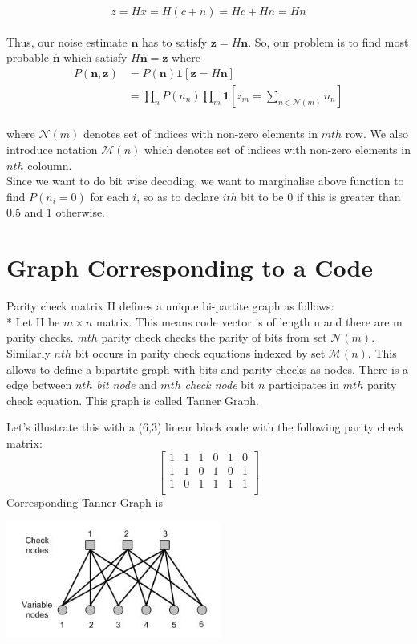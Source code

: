 \documentclass[a4paper]{article}
\begin{document}
    $$z =Hx= H(c + n) = Hc + Hn = Hn$$
    \\Thus, our noise estimate $\mathbf{n}$ has to satisfy $\mathbf{z} = H\mathbf{n}$. So, our problem is to find most probable $\mathbf{\hat{n}}$ which satisfy $H\mathbf{\hat{n}} = \mathbf{z}$ where
    \begin{align*}
    P(\mathbf{n},\mathbf{z}) &= P(\mathbf{n}) \mathbf{1}[\mathbf{z} = H\mathbf{n}]\\
    &= \prod_{n}  P(n_n)\prod_{m} \mathbf{1}[z_m = \sum_{n \in \mathcal{N}(m)} n_n]
    \end{align*}
    \\ where  $\mathcal{N}(m)$ denotes set of indices with non-zero elements in $m th$  row. We also introduce notation $\mathcal{M}(n)$ which denotes set of indices with non-zero elements in $n th$  coloumn. 
\\ Since we want to do bit wise decoding, we want to marginalise above function to find $P(n_i=0)$ for each $i$, so as to declare $i th$ bit to be $0$ if this is greater than 0.5 and $1$ otherwise.

\section{Graph Corresponding to a Code}
Parity check matrix H defines a unique bi-partite graph as follows:
\\* Let H be $m  \times n$ matrix. This means code vector is of length n and there are m parity checks. $mth$ parity check checks the parity of bits from set   $\mathcal{N}(m)$. Similarly $nth$ bit occurs in parity check equations indexed by set $\mathcal{M}(n)$. This allows to define a bipartite graph with bits and parity checks as nodes. There is a edge between $nth$ \textit{bit node} and $mth$ \textit{check node} bit $n$ participates in $mth$ parity check equation. This graph is called Tanner Graph.

Let's illustrate this with a (6,3) linear block code with the following parity check matrix:
$$\begin{bmatrix}
1 &1 &1 &0 &1 &0\\
1 &1 &0 &1 &0 &1\\
1 &0 &1 &1 &1 &1\\
\end{bmatrix}$$
Corresponding Tanner Graph is
\\
\begin{center}
\includegraphics[width=200pt]{image71.jpeg}
\end{center}
\end{document}
